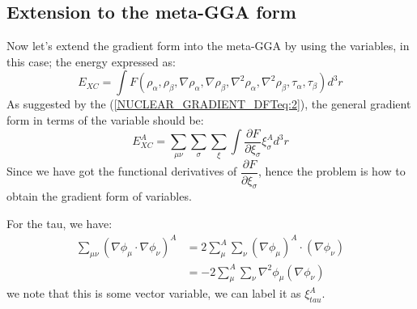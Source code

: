 \subsection{Extension to the meta-GGA form}
\label{Func_Deriv_gradient_variable_META_GGA}
%
%
%
%
%
Now let's extend the gradient form into the meta-GGA by using the
variables, in this case; the energy expressed as:
\begin{equation}
 \label{functional_meta_gga_gradient_eq:1}
E_{XC} = \int  F(\rho_{\alpha}, \rho_{\beta}, \nabla\rho_{\alpha},
\nabla\rho_{\beta}, \nabla^{2}\rho_{\alpha},
\nabla^{2}\rho_{\beta}, \tau_{\alpha}, \tau_{\beta})d^{3}r
\end{equation} 
As suggested by the (\ref{NUCLEAR_GRADIENT_DFTeq:2}), the general
gradient form in terms of the variable should be:
\begin{equation}
 \label{functional_meta_gga_gradient_eq:2}
E_{XC}^{A} = \sum_{\mu\nu}\sum_{\sigma}\sum_{\xi}\int
\frac{\partial F}{\partial \xi_{\sigma}} \xi_{\sigma}^{A} d^{3}r
\end{equation} 
Since we have got the functional derivatives of $\dfrac{\partial
F}{\partial \xi_{\sigma}}$, hence the problem is how to obtain the
gradient form of variables.

For the tau, we have:
\begin{equation}
 \label{functional_meta_gga_gradient_eq:3}
\begin{split}
 \sum_{\mu\nu}(\nabla\phi_{\mu}\cdot\nabla\phi_{\nu})^{A}
&=2
\sum_{\mu}^{A}\sum_{\nu}(\nabla\phi_{\mu})^{A}\cdot(\nabla\phi_{\nu})
\\
&=-2
\sum_{\mu}^{A}\sum_{\nu}\nabla^{2}\phi_{\mu}(\nabla\phi_{\nu})
\end{split}
\end{equation} 
we note that this is some vector variable, we can label it as
$\xi_{tau}^{A}$.


